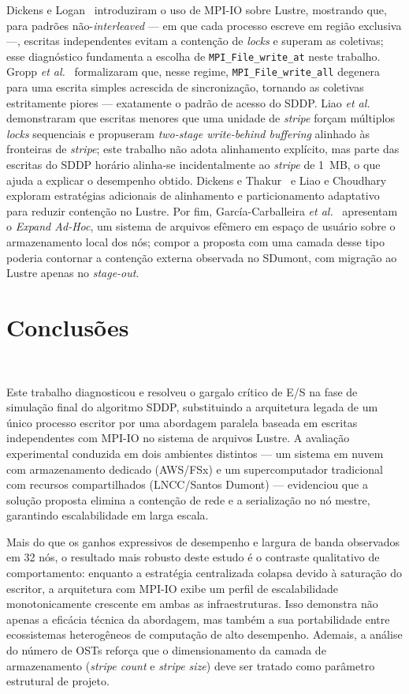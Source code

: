 \documentclass[12pt]{article}
\begin{document}
Dickens e Logan~\cite{Dickens:08} introduziram o uso de MPI-IO sobre Lustre, mostrando que, para padrões não-\textit{interleaved} --- em que cada processo escreve em região exclusiva ---, escritas independentes evitam a contenção de \textit{locks} e superam as coletivas; esse diagnóstico fundamenta a escolha de \texttt{MPI\_File\_write\_at} neste trabalho. Gropp \textit{et al.}~\cite{Gropp:08} formalizaram que, nesse regime, \texttt{MPI\_File\_write\_all} degenera para uma escrita simples acrescida de sincronização, tornando as coletivas estritamente piores --- exatamente o padrão de acesso do SDDP. Liao \textit{et al.}~\cite{LiaoIPDPS:07} demonstraram que escritas menores que uma unidade de \textit{stripe} forçam múltiplos \textit{locks} sequenciais e propuseram \textit{two-stage write-behind buffering} alinhado às fronteiras de \textit{stripe}; este trabalho não adota alinhamento explícito, mas parte das escritas do SDDP horário alinha-se incidentalmente ao \textit{stripe} de 1~MB, o que ajuda a explicar o desempenho obtido. Dickens e Thakur~\cite{Dickens:10} e Liao e Choudhary~\cite{Liao:08} exploram estratégias adicionais de alinhamento e particionamento adaptativo para reduzir contenção no Lustre. Por fim, García-Carballeira \textit{et al.}~\cite{GarciaCarballeiraISPDC:23} apresentam o \emph{Expand Ad-Hoc}, um sistema de arquivos efêmero em espaço de usuário sobre o armazenamento local dos nós; compor a proposta com uma camada desse tipo poderia contornar a contenção externa observada no SDumont, com migração ao Lustre apenas no \textit{stage-out}.

\section{Conclusões}~\label{sec:conclusao}

Este trabalho diagnosticou e resolveu o gargalo crítico de E/S na fase de simulação final do algoritmo SDDP, substituindo a arquitetura legada de um único processo escritor por uma abordagem paralela baseada em escritas independentes com MPI-IO no sistema de arquivos Lustre. A avaliação experimental conduzida em dois ambientes distintos — um sistema em nuvem com armazenamento dedicado (AWS/FSx) e um supercomputador tradicional com recursos compartilhados (LNCC/Santos Dumont) — evidenciou que a solução proposta elimina a contenção de rede e a serialização no nó mestre, garantindo escalabilidade em larga escala.

Mais do que os ganhos expressivos de desempenho e largura de banda observados em 32 nós, o resultado mais robusto deste estudo é o contraste qualitativo de comportamento: enquanto a estratégia centralizada colapsa devido à saturação do escritor, a arquitetura com MPI-IO exibe um perfil de escalabilidade monotonicamente crescente em ambas as infraestruturas. Isso demonstra não apenas a eficácia técnica da abordagem, mas também a sua portabilidade entre ecossistemas heterogêneos de computação de alto desempenho. Ademais, a análise do número de OSTs reforça que o dimensionamento da camada de armazenamento (\textit{stripe count} e \textit{stripe size}) deve ser tratado como parâmetro estrutural de projeto.
\end{document}
